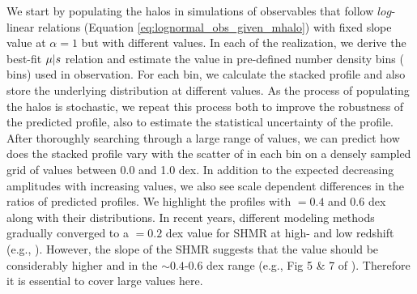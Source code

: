 \documentclass[fleqn,usenatbib,useAMS,english]{mnras}
\begin{document}
    We start by populating the halos in simulations of observables that follow $log$-linear
    relations (Equation \ref{eq:lognormal_obs_given_mhalo}) with fixed slope value at $\alpha =
    1$ but with different \scatterObsSymMhalo{} values.
    In each of the realization, we derive the best-fit $\mu | s$ relation and estimate the
    \scatterMhaloObsSym{} value in pre-defined number density bins (\topn{} bins) used in
    observation.
    For each \topn{} bin, we calculate the stacked \dsigma{} profile and also store the
    underlying \mhalo{} distribution at different \scatterMhaloObsSym{} values.
    As the process of populating the halos is stochastic, we repeat this process both to improve
    the robustness of the predicted \dsigma{} profile, also to estimate the statistical
    uncertainty of the profile.
    After thoroughly searching through a large range of \scatterObsSymMhalo{} values, we can
    predict how does the stacked \dsigma{} profile vary with the scatter of \mhalo{} in each
    \topn{} bin on a densely sampled grid of \scatterMhaloObsSym{} values between 0.0 and 1.0
    dex.
    In addition to the expected decreasing \dsigma{} amplitudes with increasing
    \scatterMhaloObsSym{} values, we also see scale dependent differences in the ratios of
    predicted \dsigma{} profiles.
    We highlight the \dsigma{} profiles with \scatterMhaloObsSym{}$=0.4$ and 0.6 dex along with
    their \mhalo{} distributions.
    In recent years, different modeling methods gradually converged to a
    \scatterObsSymMhalo{}$=0.2$ dex value for SHMR at high-\mhalo{} and low redshift (e.g.,
    \citealt{More2011, Leauthaud2012, Reddick2013, Behroozi2013, Tinker2017}).
    However, the slope of the SHMR suggests that the \scatterMhaloObsSym{} value should be
    considerably higher and in the $\sim 0.4$-0.6 dex range (e.g., Fig 5 \& 7 of
    \citealt{Wechsler2018}). Therefore it is essential to cover large \scatterMhaloObsSym{}
    values here.
    
\end{document}
